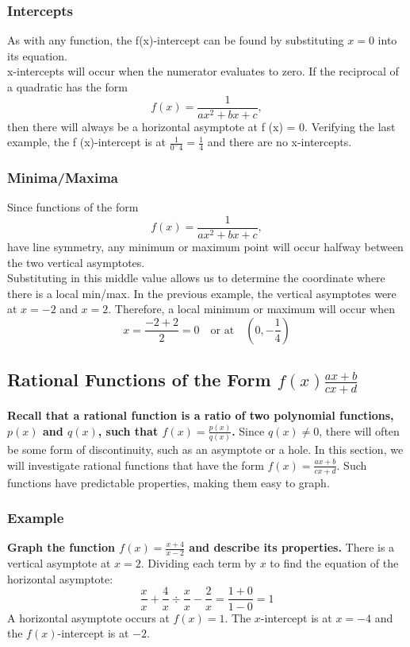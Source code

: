 \documentclass{article}
\begin{document}
\subsubsection{Intercepts}
As with any function, the f(x)-intercept can be found by
substituting $x = 0$ into its equation.\\
x-intercepts will occur when the numerator evaluates to zero.
If the reciprocal of a quadratic has the form
$$f(x) = \frac{1}{ax^2 + bx + c},$$ then there will always be a horizontal
asymptote at f (x) = 0.
Verifying the last example, the f (x)-intercept is at $\frac{1}{0^-4}=\frac{1}{4}$ and there are no x-intercepts.

\subsubsection{Minima/Maxima}
Since functions of the form $$f(x) = \frac{1}{ax^2 + bx + c},$$
have line symmetry, any minimum or maximum point will occur
halfway between the two vertical asymptotes.\\
Substituting in this middle value allows us to determine the
coordinate where there is a local min/max.
In the previous example, the vertical asymptotes were at $x = -2$ and $x = 2$.
Therefore, a local minimum or maximum will occur when\\
\begin{equation*}
    x=\frac{-2+2}{2}=0 \quad \text{or at} \quad \left(0, -\frac{1}{4}\right)
\end{equation*}
\subsection{Rational Functions of the Form $f(x)\frac{ax+b}{cx+d}$}
\textbf{Recall that a rational function is a ratio of two polynomial functions, $p(x)$ and $q(x)$, such that $f(x) = \frac{p(x)}{q(x)}$.} Since $q(x) \neq 0$, there will often be some form of discontinuity, such as an asymptote or a hole. In this section, we will investigate rational functions that have the form $f(x) = \frac{ax + b}{cx + d}$. Such functions have predictable properties, making them easy to graph.

\subsubsection*{Example}
\textbf{Graph the function $f(x) = \frac{x + 4}{x - 2}$ and describe its properties.} There is a vertical asymptote at $x = 2$. Dividing each term by $x$ to find the equation of the horizontal asymptote:
\[
\frac{x}{x} + \frac{4}{x} \div \frac{x}{x} - \frac{2}{x} = \frac{1 + 0}{1 - 0} = 1
\]
A horizontal asymptote occurs at $f(x) = 1$. The $x$-intercept is at $x = -4$ and the $f(x)$-intercept is at $-2$.
\end{document}
